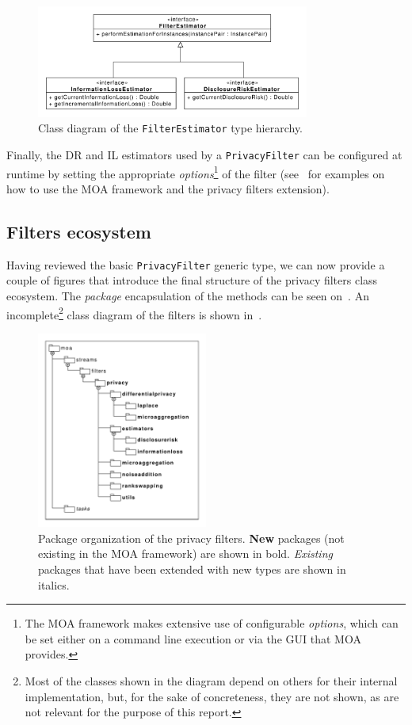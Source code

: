 \begin{figure}[h]
	\centering
	\includegraphics[width=0.8\textwidth]{figures/class_Estimators.pdf}
	\caption{Class diagram of the \texttt{FilterEstimator} type hierarchy.}
	\label{fig:estimators-uml}
\end{figure}

Finally, the DR and IL estimators used by a \texttt{PrivacyFilter} can be configured at runtime by setting the appropriate \textit{options}\footnote{The MOA framework makes extensive use of configurable \textit{options}, which can be set either on a command line execution or via the GUI that MOA provides.} of the filter (see~ for examples on how to use the MOA framework and the privacy filters extension).

\subsection{Filters ecosystem}
\label{Implementation:PrivacyFilter:Ecosystem}

Having reviewed the basic \texttt{PrivacyFilter} generic type, we can now provide a couple of figures that introduce the final structure of the privacy filters class ecosystem. The \textit{package} encapsulation of the methods can be seen on~. An incomplete\footnote{Most of the classes shown in the diagram depend on others for their internal implementation, but, for the sake of concreteness, they are not shown, as are not relevant for the purpose of this report.} class diagram of the filters is shown in~.

\begin{figure}
	\centering
	\includegraphics[width=0.5\textwidth]{figures/moa-ppsm-packages.pdf}
	\caption{Package organization of the privacy filters. \textbf{New} packages (not existing in the MOA framework) are shown in bold. \textit{Existing} packages that have been extended with new types are shown in italics.}
	\label{fig:moa-ppsm-packages}
\end{figure}

